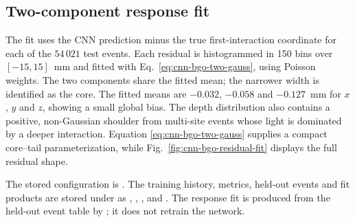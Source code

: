 {\subsection{Two-component response fit}

The fit uses the CNN prediction minus the true first-interaction coordinate for
each of the $54\,021$ test events. Each residual is histogrammed in 150 bins over
$[-15,15]$~mm and fitted with Eq.~\eqref{eq:cnn-bgo-two-gauss}, using
Poisson weights. The two components share the fitted mean; the narrower width is
identified as the core. The fitted means are $-0.032$, $-0.058$ and
$-0.127$~mm for $x$, $y$ and $z$, showing a small global bias. The depth
distribution also contains a positive, non-Gaussian shoulder from multi-site
events whose light is dominated by a deeper interaction. Equation
\eqref{eq:cnn-bgo-two-gauss} supplies a compact core--tail parameterization,
while Fig.~\ref{fig:cnn-bgo-residual-fit} displays the full residual shape.

The stored configuration is
. The training history, metrics,
held-out events and fit products are stored under
 as ,
, , 
and . The response fit is produced from the held-out
event table by ; it does not retrain the
network.
}
